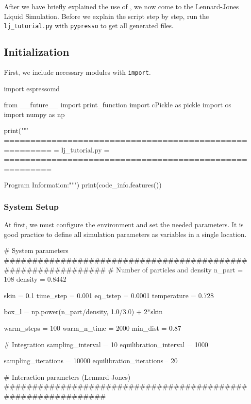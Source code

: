 \documentclass[
paper=a4,                       %
fontsize=11pt,                  %
twoside,                        %
footsepline,                    %
headsepline,                    %
headinclude=false,              %
footinclude=false,              %
pagesize,                       %
]{scrartcl}
\begin{document}
After we have briefly explained the use of \es{}, we now come to the
Lennard-Jones Liquid Simulation.  Before we explain the script step by step, run the
\texttt{lj\_tutorial.py}  with \texttt{pypresso} to get all generated files.


\subsection{Initialization}

First, we include necessary modules with \lstinline|import|.
{\small\vspace{0,2cm}
\begin{pypresso}
import espressomd

from __future__ import print_function
import cPickle as pickle
import os 
import numpy as np

print("""
=======================================================
=                    lj_tutorial.py                   =
=======================================================

Program Information:""")
print(code_info.features())
\end{pypresso}\vspace{0,2cm}

\subsubsection{System Setup}
At first, we must configure the environment and set the needed parameters.
It is good practice to define all simulation parameters as variables in a single location.
{\small\vspace{0,2cm}
\begin{pypresso}
# System parameters
#############################################################
# Number of particles and density
n_part  = 108
density = 0.8442

skin        = 0.1
time_step   = 0.001 
eq_tstep    = 0.0001
temperature = 0.728

box_l       = np.power(n_part/density, 1.0/3.0) + 2*skin

warm_steps  = 100
warm_n_time = 2000
min_dist    = 0.87

# Integration
sampling_interval       = 10
equilibration_interval  = 1000

sampling_iterations     = 10000
equilibration_iterations= 20

# Interaction parameters (Lennard-Jones)
#############################################################


\end{pypresso}}}
\end{document}
